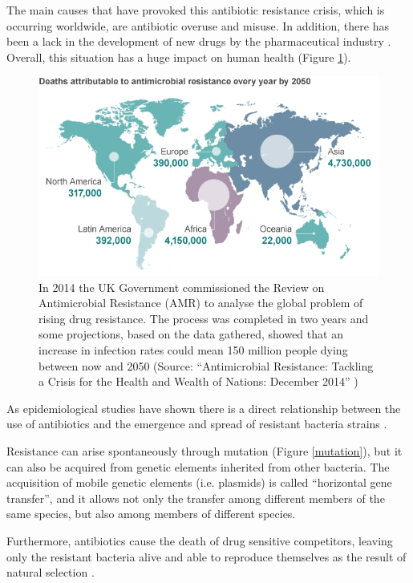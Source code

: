 \documentclass[11pt]{report}
\begin{document}
The main causes that have provoked this antibiotic resistance crisis, which is occurring worldwide, are antibiotic overuse and misuse.
In addition, there has been a lack in the development of new drugs by the pharmaceutical industry \cite{nature2013}.
Overall, this situation has a huge impact on human health (Figure
\ref{spread2050}).

\begin{figure}[htp]
\centering
\includegraphics[scale=0.80]{img/spread2050.png}
\caption{In 2014 the UK Government commissioned the Review on Antimicrobial Resistance (AMR) to analyse the global problem of rising drug resistance. The process was completed in two years and some projections, based on the data gathered, showed that an increase in infection rates could mean 150 million people dying between now and 2050 (Source: ``Antimicrobial Resistance: Tackling a Crisis for the Health and Wealth of Nations: December 2014'' \cite{review2014antimicrobial})}
\label{spread2050}
\end{figure}

As epidemiological studies have shown there is a direct relationship between the use of antibiotics and the emergence and spread of resistant bacteria strains \cite{huttner2013antimicrobial}.

Resistance can arise spontaneously through mutation (Figure \ref{mutation}), but it can also be acquired from genetic elements inherited from other bacteria.
The acquisition of mobile genetic elements (i.e. plasmids) is called “horizontal gene transfer”, and it allows not only the transfer among different members of the same species, but also among members of different species.

Furthermore, antibiotics cause the death of drug sensitive competitors, leaving only the resistant bacteria alive and able to reproduce themselves as the result of natural selection \cite{doi:10.1093/emph/eou024}.
\end{document}
